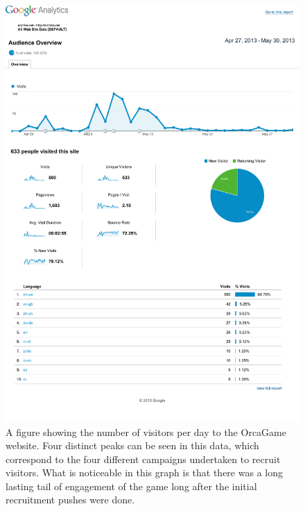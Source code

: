 \documentclass[12pt,oneside]{book}
\begin{document}
\begin{figure}[h]
\centering
\includegraphics[width=\columnwidth]{figures/orcagameGA}
\caption{A figure showing the number of visitors per day to the
  OrcaGame website.  Four distinct peaks can be seen in this
  data, which correspond to the four different campaigns undertaken to
recruit visitors.  What is noticeable in this graph is that there was
a long lasting tail of engagement of the game long after the initial
recruitment pushes were done.  }
\label{fig:OrcaGameGA}
\end{figure}
\end{document}
